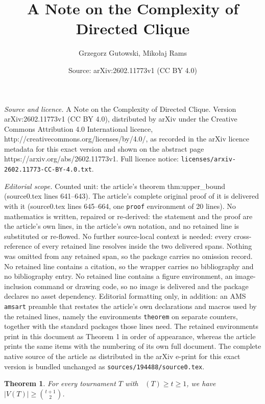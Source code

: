 \documentclass[10pt,a4paper]{amsart}
\title{A Note on the Complexity of Directed Clique}
\author{Grzegorz Gutowski, Miko{\l}aj Rams}
\date{Source: arXiv:2602.11773v1 (CC BY 4.0)}
\newtheorem{theorem}{Theorem}
\DeclareMathOperator{\diomega}{\ora \omega}
\newcommand{\norm}[1]{\left|#1\right|}
\newcommand{\ora}[1]{\overrightarrow{#1}}
\begin{document}
\maketitle

\noindent\emph{Source and licence.} A Note on the Complexity of Directed Clique. Version arXiv:2602.11773v1 (CC BY 4.0), distributed by arXiv under the Creative Commons Attribution 4.0 International licence, http://creativecommons.org/licenses/by/4.0/, as recorded in the arXiv licence metadata for this exact version and shown on the abstract page https://arxiv.org/abs/2602.11773v1. Full licence notice: \texttt{licenses/arxiv-2602.11773-CC-BY-4.0.txt}.\par\smallskip

\noindent\textit{Editorial scope.} Counted unit: the article's theorem thm:upper\_bound (source0.tex lines 641--643). The article's complete original proof of it is delivered with it (source0.tex lines 645--664, one \texttt{proof} environment of 20 lines). No mathematics is written, repaired or re-derived: the statement and the proof are the article's own lines, in the article's own notation, and no retained line is substituted or re-flowed.  No further source-local context is needed: every cross-reference of every retained line resolves inside the two delivered spans.  Nothing was omitted from any retained span, so the package carries no omission record.  No retained line contains a citation, so the wrapper carries no bibliography and no bibliography entry.  No retained line contains a figure environment, an image-inclusion command or drawing code, so no image is delivered and the package declares no asset dependency.  Editorial formatting only, in addition: an AMS \texttt{amsart} preamble that restates the article's own declarations and macros used by the retained lines, namely the environments \texttt{theorem} on separate counters, together with the standard packages those lines need.  The retained environments print in this document as Theorem 1 in order of appearance, whereas the article prints the same items with the numbering of its own full document.  The complete native source of the article as distributed in the arXiv e-print for this exact version is bundled unchanged as \texttt{sources/194488/source0.tex}.
\begin{theorem}\label{thm:upper_bound}
    For every tournament \(T\) with \(\diomega(T) \ge t \ge 1\), we have \(\norm{V(T)} \geq {{t+1}\choose{2}}\).
\end{theorem}
\end{document}
